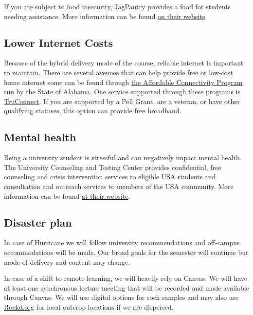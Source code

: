 \documentclass[11pt,]{article}
\begin{document}
If you are subject to food insecurity, JagPantry provides a food for
students needing assistance. More information can be found
\href{https://www.southalabama.edu/departments/sga/foodpantry.html}{on
their website}

\hypertarget{lower-internet-costs}{%
\subsection{Lower Internet Costs}\label{lower-internet-costs}}

Because of the hybrid delivery mode of the course, reliable internet is
important to maintain. There are several avenues that can help provide
free or low-cost home internet some can be found through
\href{https://adeca.alabama.gov/affordable-connectivity-program/}{the
Affordable Connectivity Program} run by the State of Alabama. One
service supported through these programs is
\href{https://www.truconnect.com/findhelp}{TruConnect}. If you are
supported by a Pell Grant, are a veteran, or have other qualifying
statuses, this option can provide free broadband.

\hypertarget{mental-health}{%
\subsection{Mental health}\label{mental-health}}

Being a university student is stressful and can negatively impact mental
health. The University Counseling and Testing Center provides
confidential, free counseling and crisis intervention services to
eligible USA students and consultation and outreach services to members
of the USA community. More information can be found
\href{https://www.southalabama.edu/departments/counseling/}{at their
website}.

\hypertarget{disaster-plan}{%
\subsection{Disaster plan}\label{disaster-plan}}

In case of Hurricane we will follow university recommendations and
off-campus accommodations will be made. Our broad goals for the semester
will continue but mode of delivery and content may change.

In case of a shift to remote learning, we will heavily rely on Canvas.
We will have at least one synchronous lecture meeting that will be
recorded and made available through Canvas. We will use digital options
for rock samples and may also use \href{https://rockd.org/}{Rockd.org}
for local outcrop locations if we are dispersed.
\end{document}

